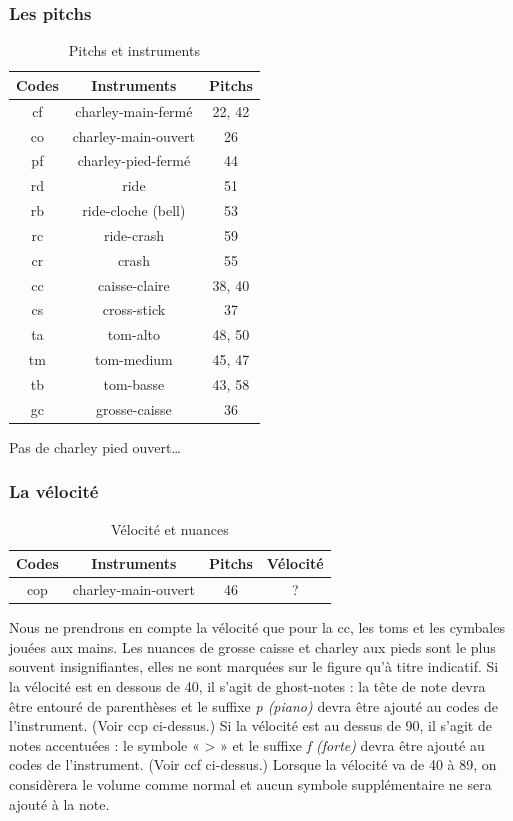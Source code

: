 \subsubsection{Les pitchs}
\begin{table}[h]
	\centering
	\begin{tabular}{|c|c|c|} \hline
		Codes & Instruments & Pitchs \\ \hline
		cf & charley-main-fermé & 22, 42 \\
		co & charley-main-ouvert & 26 \\
		pf & charley-pied-fermé & 44 \\
		rd & ride & 51 \\
		rb & ride-cloche (bell) & 53 \\
		rc & ride-crash & 59 \\
		cr & crash & 55 \\
		cc & caisse-claire & 38, 40 \\
		cs & cross-stick & 37 \\
		ta & tom-alto & 48, 50 \\
		tm & tom-medium & 45, 47 \\
		tb & tom-basse & 43, 58 \\
		gc & grosse-caisse & 36 \\ \hline
	\end{tabular}
	\caption{Pitchs et instruments}
\end{table}
Pas de charley pied ouvert…
\subsubsection{La vélocité}
\begin{table}[h]
	\centering
	\begin{tabular}{|c|c|c|c|} \hline
		Codes & Instruments & Pitchs & Vélocité \\ \hline
		cop & charley-main-ouvert & 46 & ? \\ \hline
	\end{tabular}
	\caption{Vélocité et nuances}
\end{table}
Nous ne prendrons en compte la vélocité que pour la cc, les toms et les cymbales jouées aux mains. Les nuances de grosse caisse et charley aux pieds sont le plus souvent insignifiantes, elles ne sont marquées sur le figure qu’à titre indicatif.
Si la vélocité est en dessous de 40, il s’agit de ghost-notes : la tête de note devra être entouré de parenthèses et le suffixe \textit{p (piano)} devra être ajouté au codes de l’instrument. (Voir ccp ci-dessus.)
Si la vélocité est au dessus de 90, il s’agit de notes accentuées : le symbole « > » et le suffixe \textit{f (forte)} devra être ajouté au codes de l’instrument. (Voir ccf ci-dessus.)
Lorsque la vélocité va de 40 à 89, on considèrera le volume comme normal et aucun symbole supplémentaire ne sera ajouté à la note.\\\\

